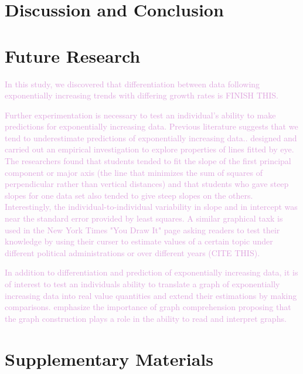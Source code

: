\documentclass[]{interact}
\theoremstyle{plain}%
\theoremstyle{definition}
\theoremstyle{remark}
\begin{document}
\hypertarget{discussion-and-conclusion}{%
\section{Discussion and Conclusion}\label{discussion-and-conclusion}}

\hypertarget{future-research}{%
\section{Future Research}\label{future-research}}

\textcolor{Plum}{
In this study, we discovered that differentiation between data following exponentially increasing trends with differing growth rates is FINISH THIS.
}

\textcolor{Plum}{
Further experimentation is necessary to test an individual's ability to make predictions for exponentially increasing data. 
Previous literature suggests that we tend to underestimate predictions of exponentially increasing data.\citep{jones_generalized_1979, jones_polynomial_1977, wagenaar_extrapolation_1978}.
\citep{mosteller_eye_1981} designed and carried out an empirical investigation to explore properties of lines fitted by eye. 
The researchers found that students tended to fit the slope of the first principal component or major axis (the line that minimizes the sum of squares of perpendicular rather than vertical distances) and that students who gave steep slopes for one data set also tended to give steep slopes on the others. 
Interestingly, the individual-to-individual variability in slope and in intercept was near the standard error provided by least squares.
A similar graphical taxk is used in the New York Times "You Draw It" page asking readers to test their knowledge by using their curser to estimate values of a certain topic under different political administrations or over different years (CITE THIS).
}

\textcolor{Plum}{
In addition to differentiation and prediction of exponentially increasing data, it is of interest to test an individuals ability to translate a graph of exponentially increasing data into real value quantities and extend their estimations by making comparisons. 
\citep{friel_making_2001} emphasize the importance of graph comprehension proposing that the graph construction plays a role in the ability to read and interpret graphs.
}

\hypertarget{supplementary-materials}{%
\section*{Supplementary Materials}\label{supplementary-materials}}



\end{document}
